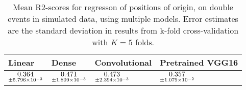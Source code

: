 \begin{table}
\centering
\caption{
Mean R2-scores for regresson of positions of origin, on double events in simulated data, using multiple models. 
Error estimates are the standard deviation in results from k-fold cross-validation 
with $K=5$ folds.
}
\label{tab:regression-simulated-double-position-r2}
\begin{tabular}{llll}
\toprule
                                             Linear &                                               Dense &                                       Convolutional &                                    Pretrained VGG16 \\
\midrule
 $\underset{\num{+- 5.796e-03 }  }{\num{ 0.364 } }$ &  $\underset{\num{+- 1.809e-03 }  }{\num{ 0.471 } }$ &  $\underset{\num{+- 2.394e-03 }  }{\num{ 0.473 } }$ &  $\underset{\num{+- 1.079e-02 }  }{\num{ 0.357 } }$ \\
\bottomrule
\end{tabular}
\end{table}
